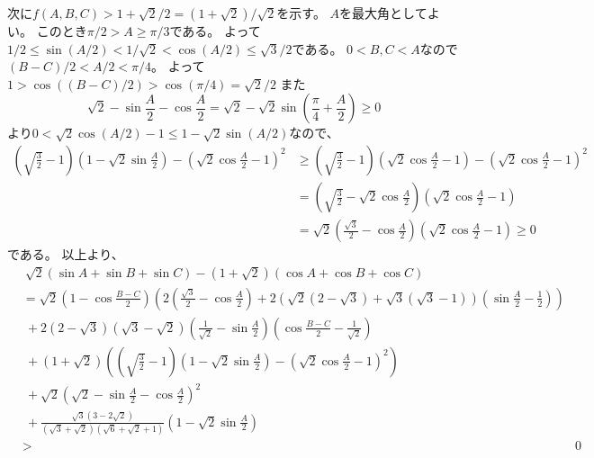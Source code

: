 \documentclass[uplatex, a5paper]{jsarticle}
\makeatletter
\theoremstyle{definition}
\renewenvironment{proof}[1][\proofname]{
  \pushQED{\qed}%
  \normalfont \topsep6\p@\@plus6\p@\relax
  \trivlist
  \item[\hskip\labelsep
    #1\@addpunct{\textbf{.}}]\ignorespaces
}{%
  \popQED\endtrivlist\@endpefalse
}
\providecommand{\proofname}{証明}
\def\qed{\hfill $\Box$}
\makeatother
\begin{document}
\begin{proof}
  次に\(f(A,B,C) > 1 + \sqrt{2}/2 = (1+ \sqrt{2})/\sqrt{2}\)を示す。
  \(A\)を最大角としてよい。
  このとき\(\pi /2 > A \geq \pi /3\)である。
  よって\(1/2 \leq \sin (A/2) < 1/ \sqrt{2} < \cos (A/2) \leq \sqrt{3}/2\)である。
  \(0<B,C<A\)なので\((B-C)/2 < A/2 < \pi /4\)。
  よって\(1 > \cos ((B-C)/2) > \cos (\pi /4) = \sqrt{2}/2\)
  また
  \[
  \sqrt{2} - \sin \frac{A}{2} - \cos \frac{A}{2}
  = \sqrt{2} - \sqrt{2}\sin \left( \frac{\pi}{4}+\frac{A}{2} \right) \geq 0
  \]
  より\(0 < \sqrt{2}\cos (A/2) -1 \leq 1 - \sqrt{2}\sin (A/2)\)なので、
  \begin{align*}
    \left( \sqrt{ \frac{3}{2} } -1 \right)
    \left( 1- \sqrt{2}\sin \frac{A}{2} \right)
    - \left( \sqrt{2}\cos \frac{A}{2} -1 \right) ^2
    &\geq \left( \sqrt{ \frac{3}{2} } -1 \right)
    \left( \sqrt{2}\cos \frac{A}{2} -1 \right)
    - \left( \sqrt{2}\cos \frac{A}{2} -1 \right) ^2 \\
    &= \left( \sqrt{ \frac{3}{2} } - \sqrt{2}\cos \frac{A}{2} \right)
    \left( \sqrt{2}\cos \frac{A}{2} -1 \right) \\
    &= \sqrt{2}\left( \frac{\sqrt{3}}{2} - \cos \frac{A}{2} \right)
    \left( \sqrt{2}\cos \frac{A}{2} -1 \right) \geq 0
  \end{align*}
  である。
  以上より、
  \begin{align*}
    & \ \sqrt{2}\left( \sin A + \sin B + \sin C \right)
    - \left( 1 + \sqrt{2} \right) \left( \cos A + \cos B + \cos C \right) \\
    &= \sqrt{2}\left( 1- \cos \frac{B-C}{2} \right)
    \left( 2 \left( \frac{\sqrt{3}}{2} - \cos \frac{A}{2} \right)
    + 2 \left( \sqrt{2}\left( 2 - \sqrt{3} \right)
    + \sqrt{3} \left( \sqrt{3} - 1 \right) \right)
    \left( \sin \frac{A}{2} - \frac{1}{2} \right) \right) \\
    & \ + 2\left( 2- \sqrt{3} \right) \left( \sqrt{3} - \sqrt{2} \right)
    \left( \frac{1}{\sqrt{2}} -\sin \frac{A}{2} \right)
    \left( \cos \frac{B-C}{2} -\frac{1}{\sqrt{2}} \right) \\
    & \ + \left( 1 + \sqrt{2} \right) \left( \left( \sqrt{ \frac{3}{2} } -1 \right)
    \left( 1- \sqrt{2} \sin \frac{A}{2} \right) - \left( \sqrt{2} \cos \frac{A}{2} - 1 \right) ^2 \right) \\
    & \ + \sqrt{2} \left( \sqrt{2} - \sin \frac{A}{2} - \cos \frac{A}{2} \right) ^2 \\
    & \ + \frac{\sqrt{3}\left( 3-2\sqrt{2} \right) }
    {\left( \sqrt{3} + \sqrt{2} \right) \left( \sqrt{6} + \sqrt{2} + 1 \right) }
    \left( 1- \sqrt{2} \sin \frac{A}{2}\right) \\
    & > & 0
  \end{align*}
\end{proof}
\end{document}
